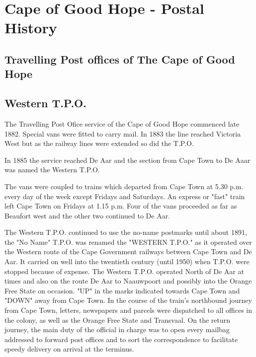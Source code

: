 \section{Cape of Good Hope - Postal History } \subsection{Travelling Post offices of The Cape of Good Hope} \subsection{Western T.P.O.} 





The Travelling Post Ofice service of the Cape of Good Hope commenced late 1882. 
Special vans were fitted to carry mail. 
In 1883 the line reached Victoria West but as the railway lines were 
extended so did the T.P.O.

In 1885 the service reached De Aar and the section from Cape Town to 
De Aaar was named the Western T.P.O.

The vans were coupled to trains which departed from Cape Town at 5.30 p.m. 
every day of the week except Fridays and Saturdays. An express or "fast" 
train left Cape Town on Fridays at 1.15 p.m. Four of the vans proceeded as 
far as Beaufort west and the other two continued to De Aar.

The Western T.P.O. continued to use the no-name postmarks until 
about 1891, the "No Name" T.P.O. was renamed the "WESTERN T.P.O." as it 
operated over the Western route of the Cape Government railways 
between Cape Town and De Aar. It carried on well into the twentieth 
century (until 1950) when T.P.O. were stopped because of expense. 
The Western T.P.O. operated North of De Aar at times and also on 
the route De Aar to Naauwpoort and possibly into the Orange Free State 
on occasion. "UP" in the marks indicated towards Cape Town and 
"DOWN" away from Cape Town. In the course of the train's northbound 
journey from Cape Town, letters, newspapers and parcels were 
dispatched to all offices in the colony, as well as the Orange 
Free State and Transvaal. On the return journey, the main duty 
of the official in charge was to open every mailbag addressed 
to forward post offices 
and to sort the correspondence to facilitate speedy delivery 
on arrival at the terminus.

